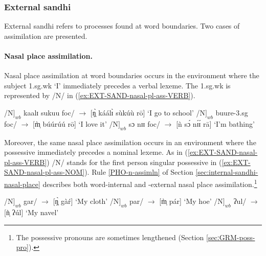 \subsubsection{External sandhi}
External sandhi refers to processes found at word boundaries.  Two cases
of  assimilation are presented.

\paragraph{Nasal place assimilation.}
\label{sec:ext-nasal-place}

Nasal place assimilation at word boundaries occurs in the environment where the subject 
 {\sc 1.sg.wk} `I'  immediately precedes a verbal lexeme.  The  {\sc 1.sg.wk} 
 is represented by  /N/ in (\ref{ex:EXT-SAND-nasal-pl-ass-VERB}).

\begin{exe}
\ex\label{ex:EXT-SAND-nasal-pl-ass-VERB} 
\begin{xlist}
 \ex\label{ex:EXT-SAND-N} 
/N$]_{wb}$ kaalɪ sukuu {\sc foc}/ $\rightarrow$ {\rm [{\sls ŋ̩̀ káálɪ̀ sùkúù rō}] `I go to 
school'}
 \ex\label{ex:EXT-SAND-m} 
/N$]_{wb}$ buure-{\sc 3.sg} {\sc foc}/   $\rightarrow$  {\rm [{\sls m̩̀ búúrúú rō}]  `I love 
it'}
 \ex\label{ex:EXT-SAND-n} 
/N$]_{wb}$ sɔ nɪɪ {\sc foc}/   $\rightarrow$   {\rm [{\sls ǹ sɔ́  nɪ́ɪ́ rā}] `I'm 
bathing'}
\end{xlist}
\end{exe}

Moreover,  the same nasal place assimilation occurs in an environment where the
possessive   immediately precedes a nominal lexeme. As in 
(\ref{ex:EXT-SAND-nasal-pl-ass-VERB})  /N/  stands for the  first person
singular
possessive   in
(\ref{ex:EXT-SAND-nasal-pl-ass-NOM}). Rule \ref{PHO-n-assimln} of Section
\ref{sec:internal-sandhi-nasal-place}  describes both word-internal and
 -external nasal place assimilation.\footnote{The possessive pronouns 
are sometimes  lengthened (Section \ref{secːGRM-poss-pro}).}

\begin{exe}
\ex\label{ex:EXT-SAND-nasal-pl-ass-NOM} 
\begin{xlist}
 \ex\label{ex:EXT-SAND-N-nom} 
/N$]_{wb}$ gar/ $\rightarrow$ {\rm  [{\sls ŋ̩̀ gàŕ}]  `My cloth'}
 \ex\label{ex:EXT-SAND-m-nom} 
/N$]_{wb}$ par/ $\rightarrow$  {\rm [{\sls m̩̀ pár}]   `My hoe'}
 \ex\label{ex:EXT-SAND-n-nom} 
/N$]_{wb}$ ʔul/ $\rightarrow$  {\rm [{\sls ǹ̩ ʔúl}]  `My navel'}
\end{xlist}
\end{exe}



